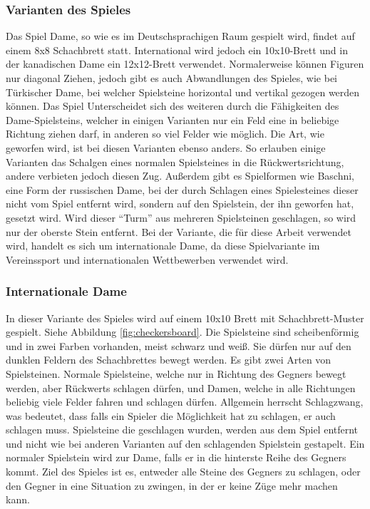 \documentclass[12pt,a4paper,bibliography=totocnumbered,listof=totocnumbered]{article}
\begin{document}
\subsubsection{Varianten des Spieles}
Das Spiel Dame, so wie es im Deutschsprachigen Raum gespielt wird, findet auf einem 8x8 Schachbrett statt. 
International wird jedoch ein 10x10-Brett und in der kanadischen Dame ein 12x12-Brett verwendet. 
Normalerweise können Figuren nur diagonal Ziehen, jedoch gibt es 
auch Abwandlungen des Spieles, wie bei Türkischer Dame, bei welcher Spielsteine horizontal und vertikal gezogen werden können.
Das Spiel Unterscheidet sich des weiteren durch die Fähigkeiten
des Dame-Spielsteins, welcher in einigen Varianten nur ein Feld eine in beliebige Richtung ziehen darf, in anderen 
so viel Felder wie möglich. Die Art, wie geworfen wird, ist bei diesen Varianten ebenso anders. So erlauben
einige Varianten das Schalgen eines normalen Spielsteines in die Rückwertsrichtung, andere verbieten 
jedoch diesen Zug. Außerdem gibt es Spielformen wie Baschni, eine Form der russischen Dame, bei der durch Schlagen 
eines Spielesteines dieser nicht vom Spiel entfernt wird, sondern auf den Spielstein, der ihn geworfen hat, gesetzt wird. 
Wird dieser ``Turm'' aus mehreren Spielsteinen geschlagen, so wird nur der oberste Stein entfernt. 
Bei der Variante, die für diese Arbeit verwendet wird, handelt es sich um internationale Dame, da diese 
Spielvariante im Vereinssport und internationalen Wettbewerben verwendet wird. \cite{DraughtsHistory}

\subsubsection{Internationale Dame}
In dieser Variante des Spieles wird auf einem 10x10 Brett mit Schachbrett-Muster gespielt.
Siehe Abbildung \ref{fig:checkersboard}. Die Spielsteine
sind scheibenförmig und in zwei Farben vorhanden, meist schwarz und weiß. Sie dürfen nur auf den dunklen
Feldern des Schachbrettes bewegt werden. Es gibt zwei Arten von Spielsteinen. Normale Spielsteine, welche
nur in Richtung des Gegners bewegt werden, aber Rückwerts schlagen dürfen, und Damen, welche
in alle Richtungen beliebig viele Felder fahren und schlagen dürfen. Allgemein herrscht Schlagzwang,
was bedeutet, dass falls ein Spieler die Möglichkeit hat zu schlagen, er auch schlagen muss.
Spielsteine die geschlagen wurden, werden aus dem Spiel entfernt und nicht wie bei anderen Varianten 
auf den schlagenden Spielstein gestapelt.
Ein normaler Spielstein wird zur Dame, falls er in die hinterste Reihe des Gegners kommt.
Ziel des Spieles ist es, entweder alle Steine des Gegners zu schlagen, oder den Gegner in eine Situation
zu zwingen, in der er keine Züge mehr machen kann. \cite{InternationalCheckersRules}
\end{document}
